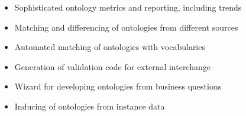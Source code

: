 \ekgmmscoringlevelFour

\begin{itemize}
    \item Sophisticated ontology metrics and reporting, including trends
    \item Matching and differencing of ontologies from different sources
    \item Automated matching of ontologies with vocabularies
    \item Generation of validation code for external interchange
    \item Wizard for developing ontologies from business questions
    \item Inducing of ontologies from instance data
\end{itemize}
